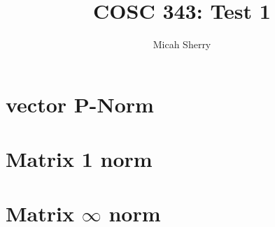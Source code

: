\documentclass{article}
\title{COSC 343: Test 1}
\author{Micah Sherry}
\begin{document}
\maketitle

\section{vector P-Norm}
	

\section{Matrix 1 norm}
	

\section{Matrix $\infty$ norm}
	
\end{document}

